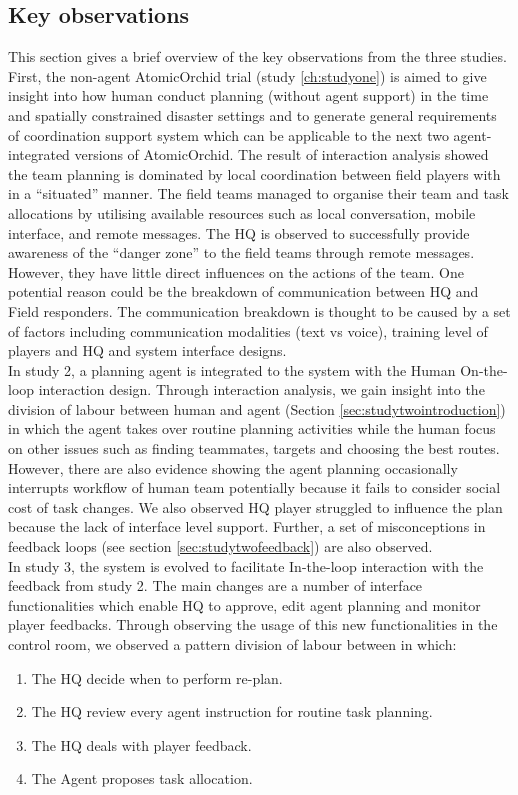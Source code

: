\subsection{Key observations}\label{sec:conclustionOB}
This section gives a brief overview of the key observations from the three studies. First, the non-agent AtomicOrchid trial (study \ref{ch:studyone}) is aimed to give insight into how human conduct planning (without agent support) in the time and spatially constrained disaster settings and to generate general requirements of coordination support system which can be applicable to the next two agent-integrated versions of AtomicOrchid. The result of interaction analysis showed the team planning is dominated by local coordination between field players with in a ``situated'' manner. The field teams managed to organise their team and task allocations by utilising available resources such as local conversation, mobile interface, and remote messages. The HQ is observed to successfully provide awareness of the ``danger zone'' to the field teams through remote messages. However, they have little direct influences on the actions of the team. One potential reason could be the breakdown of communication between HQ and Field responders. The communication breakdown is thought to be caused by a set of factors including communication modalities (text vs voice), training level of players and HQ and system interface designs.  \\

In study 2, a planning agent is integrated to the system with the Human On-the-loop interaction design.  Through interaction analysis, we gain insight into the division of labour between human and agent (Section \ref{sec:studytwointroduction}) in which the agent takes over routine planning activities while the human focus on other issues such as finding teammates, targets and choosing the best routes. However, there are also evidence showing the agent planning occasionally interrupts workflow of human team potentially because it fails to consider social cost of task changes. We also observed HQ player struggled to influence the plan because the lack of interface level support. Further, a set of misconceptions in feedback loops (see section \ref{sec:studytwofeedback}) are also observed.\\

In study 3, the system is evolved to facilitate In-the-loop interaction with the feedback from study 2. The main changes are a number of interface functionalities which enable HQ to approve, edit agent planning and monitor player feedbacks. Through observing the usage of this new functionalities in the control room, we observed a pattern division of labour between in which:
	\begin{enumerate}
	 \item The HQ decide when to perform re-plan.
	 \item The HQ review every agent instruction for routine task planning.
	 \item The HQ deals with player feedback.
	 \item The Agent proposes task allocation.
	\end{enumerate}
	
